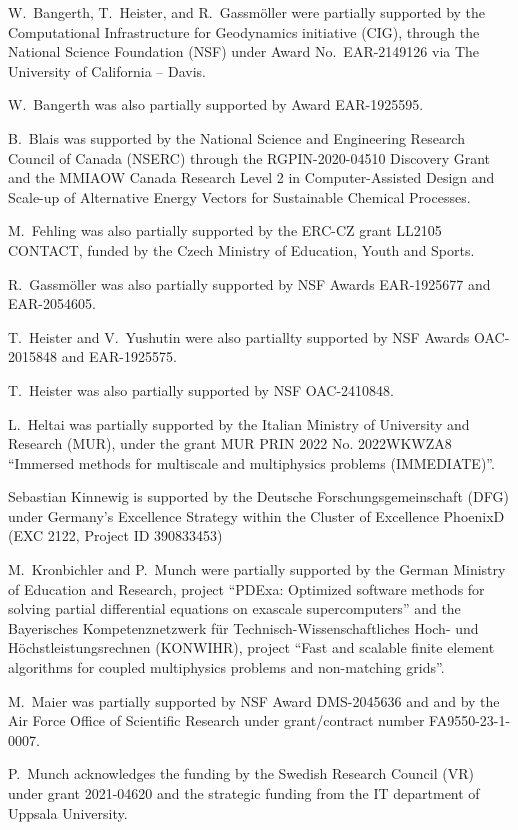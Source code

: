 \documentclass{ansarticle-preprint}
\begin{document}
W.~Bangerth, T.~Heister, and R.~Gassm\"{o}ller were partially
supported by the Computational Infrastructure for Geodynamics initiative
(CIG), through the National Science Foundation (NSF) under Award
No.~EAR-2149126 via The University of California -- Davis.

W.~Bangerth was also partially supported by Award EAR-1925595.

B.~Blais was supported by the National Science and Engineering Research Council of Canada (NSERC)  through the RGPIN-2020-04510 Discovery Grant and the MMIAOW Canada Research Level 2 in Computer-Assisted Design and Scale-up of Alternative Energy Vectors for Sustainable Chemical Processes.

M.~Fehling was also partially supported by the ERC-CZ grant LL2105
CONTACT, funded by the Czech Ministry of Education, Youth and Sports.

R.~Gassm\"{o}ller was also partially supported by NSF Awards EAR-1925677
and EAR-2054605.

T.~Heister and V.~Yushutin were also partiallty supported by NSF Awards OAC-2015848 and EAR-1925575.

T.~Heister was also partially supported by NSF OAC-2410848.

L.~Heltai was partially supported by the Italian Ministry of
University and Research (MUR), under the grant MUR PRIN 2022 No. 2022WKWZA8
``Immersed methods for multiscale and multiphysics problems (IMMEDIATE)''.

Sebastian Kinnewig is supported by the Deutsche Forschungsgemeinschaft (DFG) under Germany’s Excellence
Strategy within the Cluster of Excellence PhoenixD (EXC 2122, Project ID 390833453)

M.~Kronbichler and P.~Munch were partially supported by the
German Ministry of Education and Research, project
``PDExa: Optimized software methods for solving partial differential
equations on exascale supercomputers'' and the Bayerisches Kompetenznetzwerk
f\"ur Technisch-Wissen\-schaft\-li\-ches Hoch- und H\"ochstleistungsrechnen
(KONWIHR), project ``Fast and scalable finite element algorithms for coupled
multiphysics problems and non-matching grids''.

M.~Maier was partially supported by NSF Award DMS-2045636 and and by the
Air Force Office of Scientific Research under grant/contract number
FA9550-23-1-0007.

P.~Munch acknowledges the funding by the Swedish Research Council (VR) under grant 2021-04620 and the strategic funding from the IT department of Uppsala University.
\end{document}
